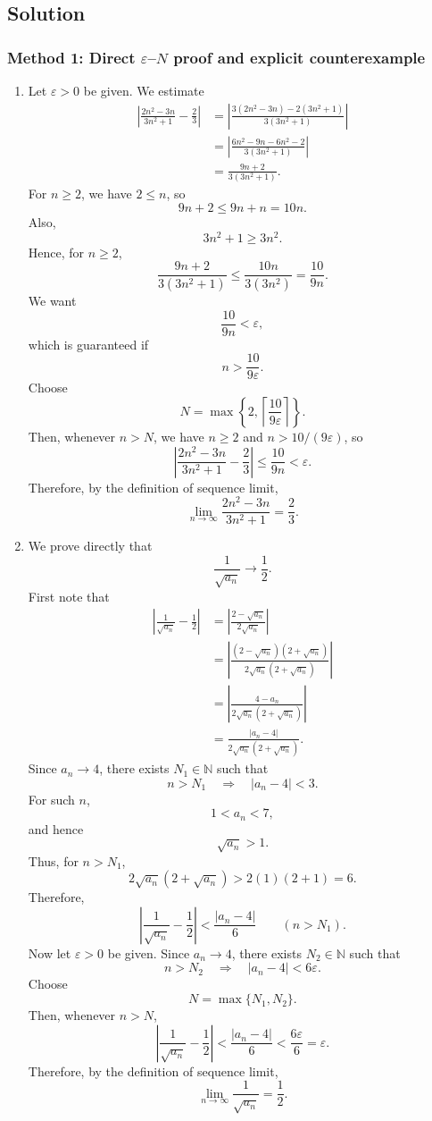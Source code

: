 \documentclass[12pt]{article}
\newcommand{\N}{\mathbb{N}}
\begin{document}
\newpage
\subsection{Solution}

\subsubsection{Method 1: Direct $\varepsilon$--$N$ proof and explicit counterexample}

\begin{enumerate}[label=(\alph*)]
\item Let $\varepsilon>0$ be given. We estimate
\begin{align*}
\left|
\frac{2n^2-3n}{3n^2+1}-\frac23
\right|
&=
\left|
\frac{3(2n^2-3n)-2(3n^2+1)}{3(3n^2+1)}
\right|\\
&=
\left|
\frac{6n^2-9n-6n^2-2}{3(3n^2+1)}
\right|\\
&=
\frac{9n+2}{3(3n^2+1)}.
\end{align*}
For $n\ge 2$, we have $2\le n$, so
\[
9n+2\le 9n+n=10n.
\]
Also,
\[
3n^2+1\ge 3n^2.
\]
Hence, for $n\ge 2$,
\[
\frac{9n+2}{3(3n^2+1)}
\le
\frac{10n}{3(3n^2)}
=
\frac{10}{9n}.
\]
We want
\[
\frac{10}{9n}<\varepsilon,
\]
which is guaranteed if
\[
n>\frac{10}{9\varepsilon}.
\]
Choose
\[
N=\max\left\{2,\left\lceil\frac{10}{9\varepsilon}\right\rceil\right\}.
\]
Then, whenever $n>N$, we have $n\ge 2$ and $n>10/(9\varepsilon)$, so
\[
\left|
\frac{2n^2-3n}{3n^2+1}-\frac23
\right|
\le
\frac{10}{9n}
<
\varepsilon.
\]
Therefore, by the definition of sequence limit,
\[
\boxed{\displaystyle \lim_{n\to\infty}\frac{2n^2-3n}{3n^2+1}=\frac23.}
\]

\item We prove directly that
\[
\frac1{\sqrt{a_n}}\to\frac12.
\]
First note that
\begin{align*}
\left|
\frac1{\sqrt{a_n}}-\frac12
\right|
&=
\left|
\frac{2-\sqrt{a_n}}{2\sqrt{a_n}}
\right|\\
&=
\left|
\frac{(2-\sqrt{a_n})(2+\sqrt{a_n})}{2\sqrt{a_n}(2+\sqrt{a_n})}
\right|\\
&=
\left|
\frac{4-a_n}{2\sqrt{a_n}(2+\sqrt{a_n})}
\right|\\
&=
\frac{|a_n-4|}{2\sqrt{a_n}(2+\sqrt{a_n})}.
\end{align*}
Since $a_n\to 4$, there exists $N_1\in\N$ such that
\[
n>N_1
\quad\Longrightarrow\quad
|a_n-4|<3.
\]
For such $n$,
\[
1<a_n<7,
\]
and hence
\[
\sqrt{a_n}>1.
\]
Thus, for $n>N_1$,
\[
2\sqrt{a_n}(2+\sqrt{a_n})
>
2(1)(2+1)
=
6.
\]
Therefore,
\[
\left|
\frac1{\sqrt{a_n}}-\frac12
\right|
<
\frac{|a_n-4|}{6}
\qquad(n>N_1).
\]
Now let $\varepsilon>0$ be given. Since $a_n\to4$, there exists $N_2\in\N$ such that
\[
n>N_2
\quad\Longrightarrow\quad
|a_n-4|<6\varepsilon.
\]
Choose
\[
N=\max\{N_1,N_2\}.
\]
Then, whenever $n>N$,
\[
\left|
\frac1{\sqrt{a_n}}-\frac12
\right|
<
\frac{|a_n-4|}{6}
<
\frac{6\varepsilon}{6}
=
\varepsilon.
\]
Therefore, by the definition of sequence limit,
\[
\boxed{\displaystyle \lim_{n\to\infty}\frac1{\sqrt{a_n}}=\frac12.}
\]


\end{enumerate}
\end{document}

